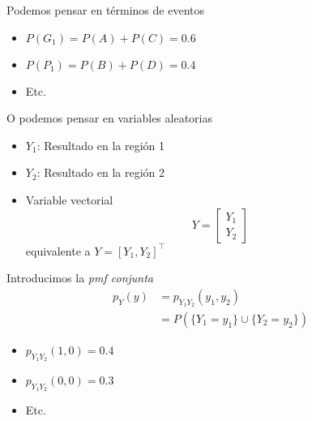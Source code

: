 \documentclass[xcolor=dvipsnames,10pt]{beamer}
\begin{document}
\begin{frame}
\begin{columns}
\begin{column}{0.48\textwidth}
\begin{overprint}
        Podemos pensar en términos de eventos
        \begin{itemize}
        \item $P(G_1) = P(A) + P(C) = 0.6$
        \item $P(P_1) = P(B) + P(D) = 0.4$
        \item Etc.
        \end{itemize}
        O podemos pensar en variables aleatorias
        \begin{itemize}
        \item $Y_1$: Resultado en la región 1
        \item $Y_2$: Resultado en la región 2
        \item Variable vectorial
          \begin{equation*}
            Y =
            \begin{bmatrix}
              Y_1\\Y_2
            \end{bmatrix}
          \end{equation*}
          equivalente a $Y = [Y_1, Y_2]^{\top}$
        \end{itemize}
        Introducimos la \emph{pmf conjunta}
        \begin{align*}
          p_Y(y) &= p_{Y_1 Y_2}(y_1, y_2)\\
          &= P \left ( \{Y_1 = y_1 \} \cup \{Y_2 = y_2 \} \right)
        \end{align*}
        \begin{itemize}
        \item $p_{Y_1 Y_2}(1, 0) = 0.4$
        \item $p_{Y_1 Y_2}(0, 0) = 0.3$
        \item Etc.
        \end{itemize}
      \end{overprint}
    \end{column}
  \end{columns}
\end{frame}
%
\end{document}
